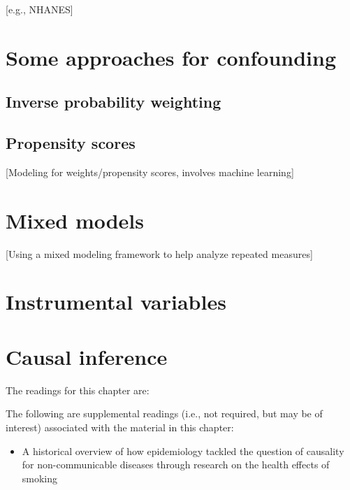 \documentclass[
]{book}
\providecommand{\tightlist}{%
  \setlength{\itemsep}{0pt}\setlength{\parskip}{0pt}}
\begin{document}
{[}e.g., NHANES{]}

\hypertarget{some-approaches-for-confounding}{%
\chapter{Some approaches for confounding}\label{some-approaches-for-confounding}}

\hypertarget{inverse-probability-weighting}{%
\section{Inverse probability weighting}\label{inverse-probability-weighting}}

\hypertarget{propensity-scores}{%
\section{Propensity scores}\label{propensity-scores}}

{[}Modeling for weights/propensity scores, involves machine learning{]}

\hypertarget{mixed-models}{%
\chapter{Mixed models}\label{mixed-models}}

{[}Using a mixed modeling framework to help analyze repeated measures{]}

\hypertarget{instrumental-variables}{%
\chapter{Instrumental variables}\label{instrumental-variables}}

\hypertarget{causal-inference}{%
\chapter{Causal inference}\label{causal-inference}}

The readings for this chapter are:

The following are supplemental readings (i.e., not required, but may be of
interest) associated with the material in this chapter:

\begin{itemize}
\tightlist
\item
  \citet{samet2016epidemiology} A historical overview of how epidemiology tackled the question of causality for non-communicable diseases through research on the health effects of smoking
\end{itemize}

  
\end{document}
